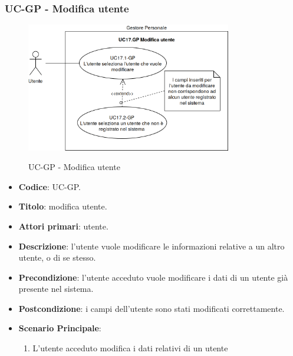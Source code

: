 \subsubsection{UC\theuccount-GP - Modifica utente}
		\begin{figure}[H]
			\centering
				\includegraphics[width=0.8\textwidth]{img/casi_d'uso/UC17.png}\\
			\caption{UC\theuccount-GP - Modifica utente}
		\end{figure}
	\begin{itemize}
		\item \textbf{Codice}: UC\theuccount-GP.
		\item \textbf{Titolo}: modifica utente.
		\item \textbf{Attori primari}: utente.
		\item \textbf{Descrizione}: l’utente vuole modificare le informazioni relative a un altro utente, o di se stesso.
		\item \textbf{Precondizione}: l'utente acceduto vuole modificare i dati di un utente già presente nel sistema.
		\item \textbf{Postcondizione}: i campi dell'utente sono stati modificati correttamente.
		\item \textbf{Scenario Principale}:
		\begin{enumerate}
			\item L'utente acceduto modifica i dati relativi di un utente
		\end{enumerate}
	\end{itemize}
	
